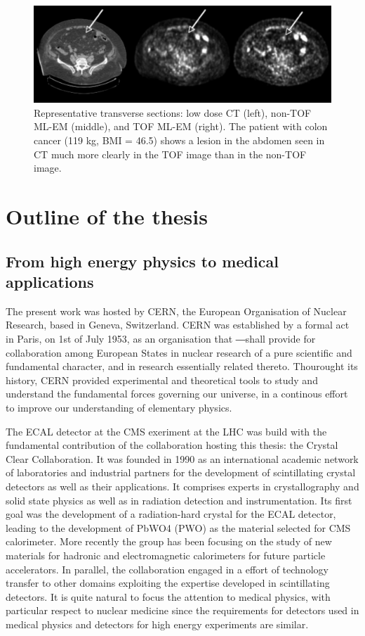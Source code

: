 \begin{figure}  
\centering
\includegraphics[width=14cm]{Pictures/Chapter_1/tof_gain.pdf}
\caption[Improvement of TOF-PET]{Representative transverse sections: low dose CT (left), non-TOF ML-EM (middle), and TOF ML-EM (right). The patient with colon cancer (119 kg, BMI = 46.5) shows a lesion in the abdomen seen in CT much more clearly in the TOF image than in the non-TOF image.\cite{Karp2008}}
\label{fig:tofgain}
\end{figure}

\section{Outline of the thesis}

\subsection{From high energy physics to medical applications}

The present work was hosted by CERN, the European Organisation of Nuclear Research, based in Geneva, Switzerland. 
CERN was established by a formal act in Paris, on 1st of July 1953, as an organisation that ―shall provide for collaboration among European States in nuclear research of a pure scientific and fundamental character, and in research essentially related thereto.
Thourought its history, CERN provided experimental and theoretical tools to study and understand the fundamental forces governing our universe, in a continous effort to improve our understanding of elementary  physics. 

The ECAL detector at the CMS exeriment at the LHC was build with the fundamental contribution of the collaboration hosting this thesis: the Crystal Clear Collaboration. It was founded in 1990 as an international academic network of laboratories and industrial partners for the development of scintillating crystal detectors as well as their applications. It comprises experts in crystallography and solid state physics as well as in radiation detection and instrumentation. 
Its first goal was the development of a radiation-hard crystal for the ECAL detector, leading to the development of PbWO4 (PWO) as the material selected for CMS calorimeter. More recently the group has been focusing on the study of new materials for hadronic and electromagnetic calorimeters for future particle accelerators.
In parallel, the collaboration engaged in a effort of technology transfer to other domains exploiting the expertise developed in scintillating detectors. It is quite natural to focus the attention to medical physics, with particular respect to nuclear medicine since the requirements for detectors used in medical physics and detectors for high energy experiments are similar.

